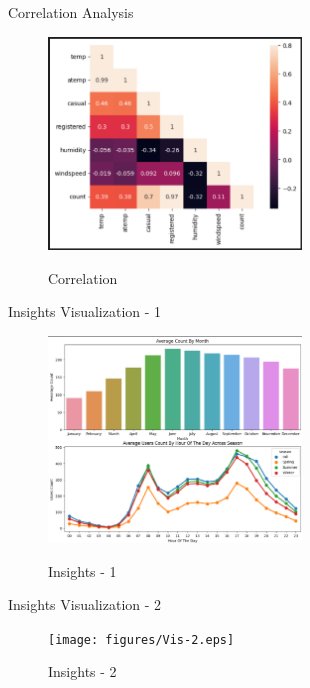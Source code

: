 \documentclass[
 size=14pt,
 paper=smartboard,  %
 mode=present, 		%
 display=slides, 	%
 style=tuliplab,  	%
 pauseslide,
 fleqn,leqno]{powerdot}
\begin{document}
\begin{slide}[toc=,bm=]{Correlation Analysis}
\begin{figure}
  \centering
  \includegraphics[width=0.6\textwidth]{figures/Correlation.eps}\\
  \caption{Correlation}\label{fig:Correlation}
\end{figure}
\end{slide}


\begin{slide}[toc=,bm=]{Insights Visualization - 1}
\begin{figure}
  \centering
  \includegraphics[width=0.6\textwidth]{figures/Vis-1.eps}\\
  \caption{Insights - 1}\label{fig:Insights1}
\end{figure}
\end{slide}

\begin{slide}[toc=,bm=]{Insights Visualization - 2}
\begin{figure}
  \centering
  \texttt{[image: figures/Vis-2.eps]}\\
  \caption{Insights - 2}\label{fig:Insights2}
\end{figure}
\end{slide}
\end{document}

